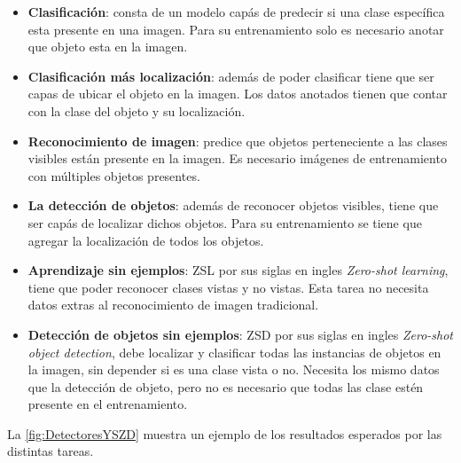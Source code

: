 \begin{itemize}
	\item \textbf{Clasificación}: consta de un modelo capás de predecir si una clase específica esta presente en una imagen. Para su entrenamiento solo es necesario anotar que objeto esta en la imagen.
	\item \textbf{Clasificación más localización}: además de poder clasificar tiene que ser capas de ubicar el objeto en la imagen. Los datos anotados tienen que contar con la clase del objeto y su localización.
	\item \textbf{Reconocimiento de imagen}: predice que objetos perteneciente a las clases visibles están presente en la imagen. Es necesario imágenes de entrenamiento con múltiples objetos presentes.
	\item \textbf{La detección de objetos}: además de reconocer objetos visibles, tiene que ser capás de localizar dichos objetos. Para su entrenamiento se tiene que agregar la localización de todos los objetos. 
	\item \textbf{Aprendizaje sin ejemplos}: ZSL por sus siglas en ingles \textit{Zero-shot learning}, tiene que poder reconocer clases vistas y no vistas. Esta tarea no necesita datos extras al reconocimiento de imagen tradicional. 
	\item \textbf{Detección de objetos sin ejemplos}: ZSD por sus siglas en ingles \textit{Zero-shot object detection}, debe localizar y clasificar todas las instancias de objetos en la imagen, sin depender si es una clase vista o no. Necesita los mismo datos que la detección de objeto, pero no es necesario que todas las clase estén presente en el entrenamiento.
\end{itemize}

La \autoref{fig:DetectoresYSZD} muestra un ejemplo de los resultados esperados por las distintas tareas.\\

